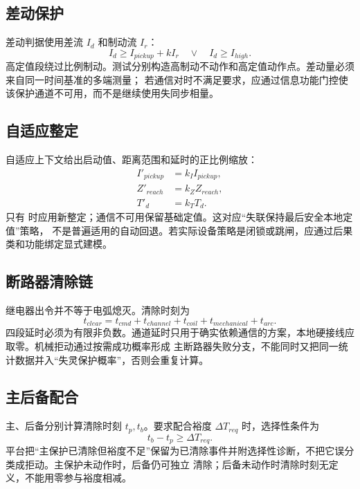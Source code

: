 \subsection{差动保护}
差动判据使用差流 $I_d$ 和制动流 $I_r$：
\begin{equation}
 I_d\ge I_{pickup}+kI_r\quad\lor\quad I_d\ge I_{high}.
\end{equation}
高定值段绕过比例制动。测试分别构造高制动不动作和高定值动作点。差动量必须来自同一时间基准的多端测量；
若通信对时不满足要求，应通过信息功能门控使该保护通道不可用，而不是继续使用失同步相量。

\subsection{自适应整定}
自适应上下文给出启动值、距离范围和延时的正比例缩放：
\begin{align}
 I'_{pickup}&=k_I I_{pickup},\\
 Z'_{reach}&=k_Z Z_{reach},\\
 T'_d&=k_TT_d.
\end{align}
只有  时应用新整定；通信不可用保留基础定值。这对应“失联保持最后安全本地定值”策略，
不是普遍适用的自动回退。若实际设备策略是闭锁或跳闸，应通过后果类和功能绑定显式建模。

\subsection{断路器清除链}
继电器出令并不等于电弧熄灭。清除时刻为
\begin{equation}
 t_{clear}=t_{cmd}+t_{channel}+t_{coil}+t_{mechanical}+t_{arc}.
\end{equation}
四段延时必须为有限非负数。通道延时只用于确实依赖通信的方案，本地硬接线应取零。机械拒动通过按需成功概率形成
主断路器失败分支，不能同时又把同一统计数据并入“失灵保护概率”，否则会重复计算。

\subsection{主后备配合}
主、后备分别计算清除时刻 $t_p,t_b$。要求配合裕度 $\Delta T_{req}$ 时，选择性条件为
\begin{equation}
 t_b-t_p\ge\Delta T_{req}.
\end{equation}
平台把“主保护已清除但裕度不足”保留为已清除事件并附选择性诊断，不把它误分类成拒动。主保护未动作时，后备仍可独立
清除；后备未动作时清除时刻无定义，不能用零参与裕度相减。

